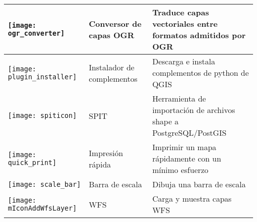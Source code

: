 \begin{minipage}{\textwidth}
\begin{table}[H]
\begin{tabular}{|l|l|p{4in}|}
\hline
\texttt{[image: ogr\_converter]}
 & Conversor de capas OGR \index{plugins!OGR converter} & Traduce capas vectoriales entre formatos admitidos por OGR\\
\hline
\texttt{[image: plugin\_installer]}
 & Instalador de complementos \index{plugins!Plugin Installer} & Descarga e instala complementos de python de QGIS\\
\hline
\texttt{[image: spiticon]}
 & SPIT \index{plugins!spit}& Herramienta de importación de archivos shape a PostgreSQL/PostGIS \\
\hline
\texttt{[image: quick\_print]}
 & Impresión rápida \index{plugins!quick print}& Imprimir un mapa rápidamente con un mínimo esfuerzo \\
\hline
\texttt{[image: scale\_bar]}
 & Barra de escala \index{plugins!scalebar}& Dibuja una barra de escala\\
\hline
\texttt{[image: mIconAddWfsLayer]}
 & WFS & Carga y muestra capas WFS \\
\hline
\end{tabular}
\end{table}
\end{minipage}

\normalsize

\begin{Tip}\caption{\textsc{Configuración de complementos guardada en proyecto}}
\end{Tip}

